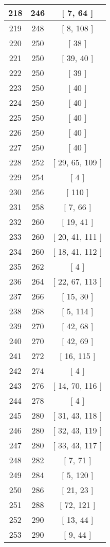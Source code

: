 \begin{center}
\begin{longtable}[H]{|| c c c ||}
\hline
218 & 246 & [ 7, 64 ] \\ 
\hline
219 & 248 & [ 8, 108 ] \\ 
\hline
220 & 250 & [ 38 ] \\ 
\hline
221 & 250 & [ 39, 40 ] \\ 
\hline
222 & 250 & [ 39 ] \\ 
\hline
223 & 250 & [ 40 ] \\ 
\hline
224 & 250 & [ 40 ] \\ 
\hline
225 & 250 & [ 40 ] \\ 
\hline
226 & 250 & [ 40 ] \\ 
\hline
227 & 250 & [ 40 ] \\ 
\hline
228 & 252 & [ 29, 65, 109 ] \\ 
\hline
229 & 254 & [ 4 ] \\ 
\hline
230 & 256 & [ 110 ] \\ 
\hline
231 & 258 & [ 7, 66 ] \\ 
\hline
232 & 260 & [ 19, 41 ] \\ 
\hline
233 & 260 & [ 20, 41, 111 ] \\ 
\hline
234 & 260 & [ 18, 41, 112 ] \\ 
\hline
235 & 262 & [ 4 ] \\ 
\hline
236 & 264 & [ 22, 67, 113 ] \\ 
\hline
237 & 266 & [ 15, 30 ] \\ 
\hline
238 & 268 & [ 5, 114 ] \\ 
\hline
239 & 270 & [ 42, 68 ] \\ 
\hline
240 & 270 & [ 42, 69 ] \\ 
\hline
241 & 272 & [ 16, 115 ] \\ 
\hline
242 & 274 & [ 4 ] \\ 
\hline
243 & 276 & [ 14, 70, 116 ] \\ 
\hline
244 & 278 & [ 4 ] \\ 
\hline
245 & 280 & [ 31, 43, 118 ] \\ 
\hline
246 & 280 & [ 32, 43, 119 ] \\ 
\hline
247 & 280 & [ 33, 43, 117 ] \\ 
\hline
248 & 282 & [ 7, 71 ] \\ 
\hline
249 & 284 & [ 5, 120 ] \\ 
\hline
250 & 286 & [ 21, 23 ] \\ 
\hline
251 & 288 & [ 72, 121 ] \\ 
\hline
252 & 290 & [ 13, 44 ] \\ 
\hline
253 & 290 & [ 9, 44 ] \\ 

\end{longtable}
\end{center}
